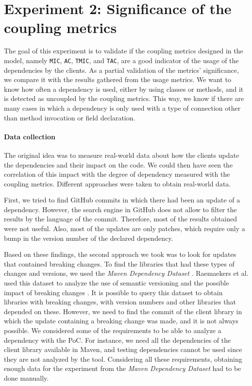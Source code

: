 \section{Experiment 2: Significance of the coupling metrics}\label{sec:experiment2}

The goal of this experiment is to validate if the coupling metrics designed in the model, namely \texttt{MIC}, \texttt{AC}, \texttt{TMIC}, and \texttt{TAC}, are a good indicator of the usage of the dependencies by the clients. As a partial validation of the metrics' significance, we compare it with the results gathered from the usage metrics. We want to know how often a dependency is used, either by using classes or methods, and it is detected as uncoupled by the coupling metrics. This way, we know if there are many cases in which a dependency is only used with a type of connection other than method invocation or field declaration.

\paragraph{Data collection}
The original idea was to measure real-world data about how the clients update the dependencies and their impact on the code. We could then have seen the correlation of this impact with the degree of dependency measured with the coupling metrics. Different approaches were taken to obtain real-world data.

First, we tried to find GitHub commits in which there had been an update of a dependency. However, the search engine in GitHub does not allow to filter the results by the language of the commit. Therefore, most of the results obtained were not useful. Also, most of the updates are only patches, which require only a bump in the version number of the declared dependency.

Based on these findings, the second approach we took was to look for updates that contained breaking changes. To find the libraries that had these types of changes and versions, we used the \textit{Maven Dependency Dataset} \cite{Raemaekers2013}. Raemaekers et al. used this dataset to analyze the use of semantic versioning and the possible impact of breaking changes \cite{Raemaekers2017}. It is possible to query this dataset to obtain libraries with breaking changes, with version numbers and other libraries that depended on these. However, we need to find the commit of the client library in which the update containing a breaking change was made, and it is not always possible. We considered some of the requirements to be able to analyze a dependency with the PoC. For instance, we need all the dependencies of the client library available in Maven, and testing dependencies cannot be used since they are not analyzed by the tool. Considering all these requirements, obtaining enough data for the experiment from the \textit{Maven Dependency Dataset} had to be done manually.

